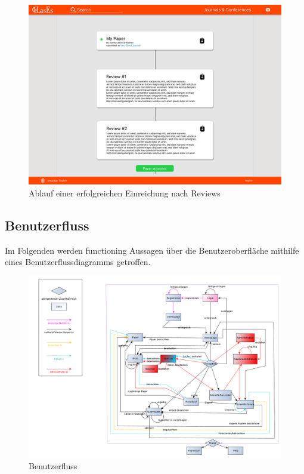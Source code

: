 \begin{figure}[H]
	\centering
	\includegraphics[width=\linewidth]{graphics/Paper}
	\caption{Ablauf einer erfolgreichen Einreichung nach Reviews}
	\label{fig:paperMockup}
\end{figure}


\subsection{Benutzerfluss}
Im Folgenden werden functioning Aussagen über die Benutzeroberfläche mithilfe eines Benutzerflussdiagramms getroffen.

\begin{figure}[H]
    \centering
    \includegraphics[width=\linewidth]{graphics/benutzerFlussyEd}
    \caption{Benutzerfluss}
	\label{fig:benutzerfluss}
\end{figure}


